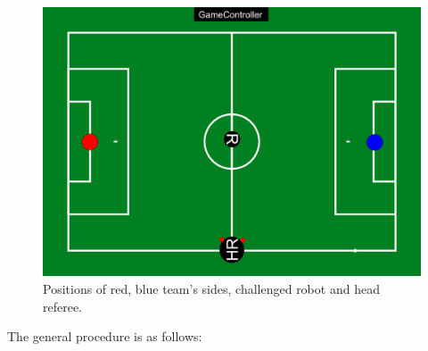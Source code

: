         \begin{figure}[ht!]
            \begin{center}
                \leavevmode
                \includegraphics[width=1\columnwidth]{figs/referee-signals/vrc_initial.png}
                \caption{Positions of {\color{red}red}, {\color{blue}blue} team's sides, challenged robot and head referee.}
                \label{fig:visual_referee_inital_positions}
            \end{center}
        \end{figure}
        
        The general procedure is as follows:

